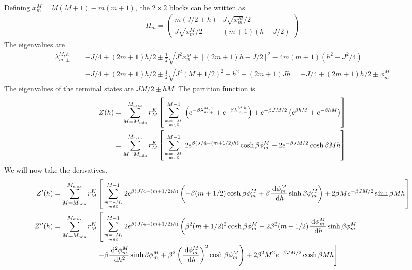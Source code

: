 \documentclass{revtex4-2}
\begin{document}
Defining \(x^M_m = M(M+1) - m(m+1)\), the \(2\times 2\) blocks can be written as
\begin{align}
	H_m = \begin{pmatrix} m(J/2 + h) & J\sqrt{x^M_m}/2 \\ J\sqrt{x^M_m}/2 & (m+1)(h - J/2) \end{pmatrix} 
\end{align}
The eigenvalues are 
\begin{align}
	\lambda_{m, \pm}^{M, h} &= -J/4 + (2m+1)h/2 \pm \frac{1}{2}\sqrt{J^2x^M_m + \left[(2m+1)h - J/2\right]^2 - 4m(m+1)(h^2 - J^2/4)} \\
				&= -J/4 + (2m+1)h/2 \pm \frac{1}{2}\sqrt{J^2(M + 1/2)^2 + h^2 - (2m+1)Jh}	= -J/4 + (2m+1)h/2 \pm \phi^M_m
\end{align}
The eigenvalues of the terminal states are \(JM/2 \pm hM\). The partition function is
\begin{align}
	Z(h) &= \sum_{M=M_\text{min}}^{M_\text{max}}r^K_M\left[\sum_{m=-M, \atop{m\in \mathbb{Z}}}^{M-1}\left(e^{-\beta \lambda_{m, +}^{M, h}} + e^{-\beta \lambda_{m, -}^{M, h}}\right) + e^{-\beta JM/2}\left(e^{\beta hM} + e^{-\beta hM}\right)\right] \\
	     &=\sum_{M=M_\text{min}}^{M_\text{max}}r^K_M\left[\sum_{m=-M, \atop{m\in \mathbb{Z}}}^{M-1}2e^{\beta \left(J/4 - (m+1/2)h\right)}\cosh \beta\phi^M_m + 2e^{-\beta JM/2}\cosh \beta Mh\right]
\end{align}
We will now take the derivatives.
\begin{align}
	Z^\prime(h) &=\sum_{M=M_\text{min}}^{M_\text{max}}r^K_M\left[\sum_{m=-M, \atop{m\in \mathbb{Z}}}^{M-1}2e^{\beta \left(J/4 - (m+1/2)h\right)}\left(-\beta (m+1/2) \cosh \beta\phi^M_m + \beta\frac{\:\mathrm{d}\phi^M_m}{\:\mathrm{d}h}\sinh \beta\phi^M_m\right)+ 2\beta Me^{-\beta JM/2}\sinh \beta Mh\right]\\
	Z^{\prime\prime}(h) &=\sum_{M=M_\text{min}}^{M_\text{max}}r^K_M\left[\sum_{m=-M, \atop{m\in \mathbb{Z}}}^{M-1}2 e^{\beta \left(J/4 - (m+1/2)h\right)}\left(\beta^2 (m+1/2)^2 \cosh \beta\phi^M_m - 2\beta^2 (m+1/2)\frac{\:\mathrm{d}\phi^M_m}{\:\mathrm{d}h}\sinh \beta\phi^M_m\right.\right.\\
			    &\quad\quad\quad\quad\quad\quad\left.\left. + \beta\frac{\:\mathrm{d^2}\phi^M_m}{\:\mathrm{d}h^2}\sinh \beta\phi^M_m + \beta^2\left(\frac{\:\mathrm{d}\phi^M_m}{\:\mathrm{d}h}\right)^2 \cosh \beta\phi^M_m\right) + 2\beta^2 M^2 e^{-\beta JM/2}\cosh \beta Mh\right]\\
\end{align}
\end{document}
